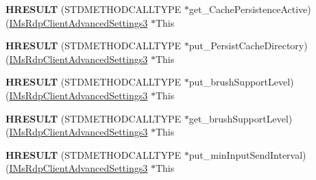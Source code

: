 \begin{DoxyCompactItemize}
\item 
\mbox{\label{struct_m_s_t_s_c_lib_1_1_i_ms_rdp_client_advanced_settings3_vtbl_afc5dd545e1a504fe5d545f4cebb0d4bb}} 
{\bfseries H\+R\+E\+S\+U\+LT} (S\+T\+D\+M\+E\+T\+H\+O\+D\+C\+A\+L\+L\+T\+Y\+PE $\ast$get\+\_\+\+Cache\+Persistence\+Active)(\hyperlink{interface_m_s_t_s_c_lib_1_1_i_ms_rdp_client_advanced_settings3}{I\+Ms\+Rdp\+Client\+Advanced\+Settings3} $\ast$This
\item 
\mbox{\label{struct_m_s_t_s_c_lib_1_1_i_ms_rdp_client_advanced_settings3_vtbl_af734a67377baf0f216b8ac1d928ac813}} 
{\bfseries H\+R\+E\+S\+U\+LT} (S\+T\+D\+M\+E\+T\+H\+O\+D\+C\+A\+L\+L\+T\+Y\+PE $\ast$put\+\_\+\+Persist\+Cache\+Directory)(\hyperlink{interface_m_s_t_s_c_lib_1_1_i_ms_rdp_client_advanced_settings3}{I\+Ms\+Rdp\+Client\+Advanced\+Settings3} $\ast$This
\item 
\mbox{\label{struct_m_s_t_s_c_lib_1_1_i_ms_rdp_client_advanced_settings3_vtbl_aa4fd2c75584c71bb5435049555aed450}} 
{\bfseries H\+R\+E\+S\+U\+LT} (S\+T\+D\+M\+E\+T\+H\+O\+D\+C\+A\+L\+L\+T\+Y\+PE $\ast$put\+\_\+brush\+Support\+Level)(\hyperlink{interface_m_s_t_s_c_lib_1_1_i_ms_rdp_client_advanced_settings3}{I\+Ms\+Rdp\+Client\+Advanced\+Settings3} $\ast$This
\item 
\mbox{\label{struct_m_s_t_s_c_lib_1_1_i_ms_rdp_client_advanced_settings3_vtbl_a099ade1329c4c31f354ab42de94ea659}} 
{\bfseries H\+R\+E\+S\+U\+LT} (S\+T\+D\+M\+E\+T\+H\+O\+D\+C\+A\+L\+L\+T\+Y\+PE $\ast$get\+\_\+brush\+Support\+Level)(\hyperlink{interface_m_s_t_s_c_lib_1_1_i_ms_rdp_client_advanced_settings3}{I\+Ms\+Rdp\+Client\+Advanced\+Settings3} $\ast$This
\item 
\mbox{\label{struct_m_s_t_s_c_lib_1_1_i_ms_rdp_client_advanced_settings3_vtbl_ac4dd7819a97a8742107c4c0ba42d7544}} 
{\bfseries H\+R\+E\+S\+U\+LT} (S\+T\+D\+M\+E\+T\+H\+O\+D\+C\+A\+L\+L\+T\+Y\+PE $\ast$put\+\_\+min\+Input\+Send\+Interval)(\hyperlink{interface_m_s_t_s_c_lib_1_1_i_ms_rdp_client_advanced_settings3}{I\+Ms\+Rdp\+Client\+Advanced\+Settings3} $\ast$This

\end{DoxyCompactItemize}
